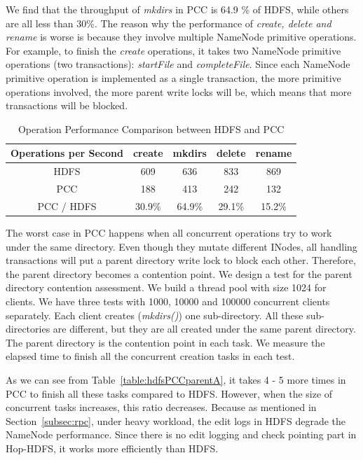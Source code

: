 \documentclass[runningheads,a4paper]{llncs}
\begin{document}
We find that the throughput of \textit{mkdirs} in PCC is 64.9 \% of HDFS, while others are all less than 30\%. The reason why the performance of \textit{create, delete and rename} is worse is because they involve multiple NameNode primitive operations. For example, to finish the \textit{create} operations, it takes two NameNode primitive operations (two transactions): \textit{startFile} and \textit{completeFile}. Since each NameNode primitive operation is implemented as a single transaction, the more primitive operations involved, the more parent write locks will be, which means that more transactions will be blocked.

\begin{table}[h]
	\centering
	\begin{tabular}{|c|c|c|c|c|}
		\hline
		\textbf{Operations per Second} & \textbf{create} & \textbf{mkdirs} & \textbf{delete} & \textbf{rename} \\ \hline
		HDFS                           & 609             & 636             & 833             & 869             \\ \hline
		PCC                 & 188             & 413             & 242             & 132             \\ \hline
		PCC / HDFS              & 30.9\%          & 64.9\%          & 29.1\%          & 15.2\%          \\ \hline
	\end{tabular}
	\caption{Operation Performance Comparison between HDFS and PCC}
	\label{table:nntpbb}
\end{table}

The worst case in PCC happens when all concurrent operations try to work under the same directory. Even though they mutate different INodes, all handling transactions will put a parent directory write lock to block each other. Therefore, the parent directory becomes a contention point. We design a test for the parent directory contention assessment. We build a thread pool with size 1024 for clients. We have three tests with 1000, 10000 and 100000 concurrent clients separately. Each client creates (\textit{mkdirs()}) one sub-directory. All these sub-directories are different, but they are all created under the same parent directory. The parent directory is the contention point in each task. We measure the elapsed time to finish all the concurrent creation tasks in each test.

As we can see from Table~\ref{table:hdfsPCCparentA}, it takes 4 - 5 more times in PCC to finish all these tasks compared to HDFS. However, when the size of concurrent tasks increases, this ratio decreases. Because as mentioned in Section~\ref{subsec:rpc}, under heavy workload, the edit logs in HDFS degrade the NameNode performance. Since there is no edit logging and check pointing part in Hop-HDFS, it works more efficiently than HDFS.
\end{document}
